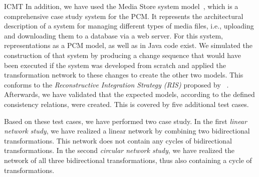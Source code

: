 \begin{copiedFrom}{ICMT}
In addition, we have used the Media Store system model~\cite{strittmatter2016a}, which is a comprehensive case study system for the \gls{PCM}.
It represents the architectural description of a system for managing different types of media files, i.e., uploading and downloading them to a database via a web server.
For this system, representations as a \gls{PCM} model, as well as in Java code exist.
We simulated the construction of that system by producing a change sequence that would have been executed if the system was developed from scratch and applied the transformation network to these changes to create the other two models.
This conforms to the \emph{Reconstructive Integration Strategy (RIS)} proposed by \citeauthor{langhammer2017a}~\cite{langhammer2017a,klare2020Vitruv-JSS}.
Afterwards, we have validated that the expected models, according to the defined consistency relations, were created.
This is covered by five additional test cases.

Based on these test cases, we have performed two case study.
In the first \emph{linear network study}, we have realized a linear network by combining two bidirectional transformations. This network does not contain any cycles of bidirectional transformations.
In the second \emph{circular network study}, we have realized the network of all three bidirectional transformations, thus also containing a cycle of transformations.


\end{copiedFrom}
